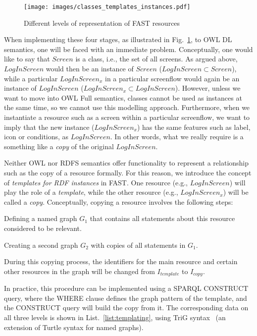 \documentclass[twoside]{fast_latex}
\begin{document}
\begin{figure}[ht]
  \begin{center}
    \texttt{[image: images/classes\_templates\_instances.pdf]}
    \caption{Different levels of representation of FAST resources}
    \label{fig:classes_templates}
  \end{center}
\end{figure}

When implementing these four stages, as illustrated in Fig.~\ref{fig:classes_templates}, to OWL DL semantics, one will be faced with an immediate problem. Conceptually, one would like to say that $Screen$ is a class, i.e., the set of all screens. As argued above, $LogInScreen$ would then be an instance of $Screen$ ($LogInScreen \subset Screen$), while a particular $LogInScreen_x$ in a particular screenflow would again be an instance of $LogInScreen$ ($LogInScreen_x \subset LogInScreen$). However, unless we want to move into OWL Full semantics, classes cannot be used as instances at the same time, so we cannot use this modelling approach. Furthermore, when we instantiate a resource such as a screen within a particular screenflow, we want to imply that the new instance ($LogInScreen_x$) has the same features such as label, icon or conditions, as $LogInScreen$. In other words, what we really require is a something like a \emph{copy} of the original $LogInScreen$. 

Neither OWL nor RDFS semantics offer functionality to represent a relationship such as the copy of a resource formally. For this reason, we introduce the concept of \emph{templates for RDF instances} in FAST. One resource (e.g., $LogInScreen$) will play the role of a \emph{template}, while the other resource (e.g., $LogInScreen_x$) will be called a \emph{copy}. Conceptually, copying a resource involves the following steps:
\begin{inparaenum}[(i)]
	\item Defining a named graph $G_1$ that contains all statements about this resource considered to be relevant.
	\item Creating a second graph $G_2$ with copies of all statements in $G_1$.
	\item During this copying process, the identifiers for the main resource and certain other resources in the graph will be changed from $I_{template}$ to $I_{copy}$.
\end{inparaenum}	
In practice, this procedure can be implemented using a SPARQL CONSTRUCT query, where the WHERE clause defines the graph pattern of the template, and the CONSTRUCT query will build the copy from it. The corresponding data on all three levels is shown in List.~\ref{list:templating}, using TriG syntax~\cite{bizer2004trig} (an extension of Turtle syntax for named graphs).
\end{document}

